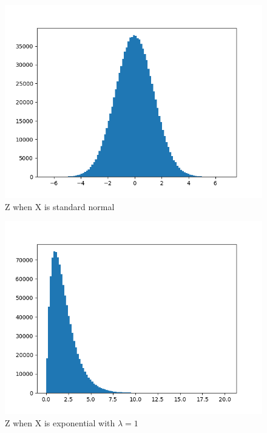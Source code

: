 \documentclass[journal,12pt,twocolumn]{IEEEtran}
\begin{document}
\begin{figure}[!ht]
\centering
\includegraphics[width=\columnwidth]{figures/norm.png}
\caption{Z when X is standard normal}
\label{fig:normal}
\end{figure}
\begin{figure}[!ht]
\centering
\includegraphics[width=\columnwidth]{figures/expon.png}
\caption{Z when X is exponential with $\lambda = 1$}
\label{fig:exponential}
\end{figure}
\end{document}
